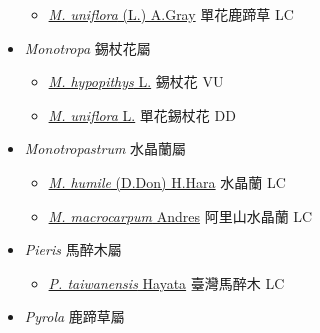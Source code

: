\begin{itemize}
  \begin{itemize}
        \item[] \href{http://www.theplantlist.org/tpl1.1/search?q=Moneses+uniflora}{\textit{M. uniflora} (L.) A.Gray}   單花鹿蹄草 LC
  \end{itemize}
 \item[] \textit{Monotropa} 錫杖花屬
                    
  \begin{itemize}
        \item[] \href{http://www.theplantlist.org/tpl1.1/search?q=Monotropa+hypopithys}{\textit{M. hypopithys} L.}   錫杖花 VU
        \item[] \href{http://www.theplantlist.org/tpl1.1/search?q=Monotropa+uniflora}{\textit{M. uniflora} L.}   單花錫杖花 DD
  \end{itemize}
 \item[] \textit{Monotropastrum} 水晶蘭屬
                    
  \begin{itemize}
        \item[] \href{http://www.theplantlist.org/tpl1.1/search?q=Monotropastrum+humile}{\textit{M. humile} (D.Don) H.Hara}     水晶蘭 LC
        \item[] \href{http://www.theplantlist.org/tpl1.1/search?q=Monotropastrum+macrocarpum}{\textit{M. macrocarpum} Andres}     阿里山水晶蘭 LC
  \end{itemize}
 \item[] \textit{Pieris} 馬醉木屬
                    
  \begin{itemize}
        \item[] \href{http://www.theplantlist.org/tpl1.1/search?q=Pieris+taiwanensis}{\textit{P. taiwanensis} Hayata}   臺灣馬醉木 LC
  \end{itemize}
 \item[] \textit{Pyrola} 鹿蹄草屬
                    

\end{itemize}
